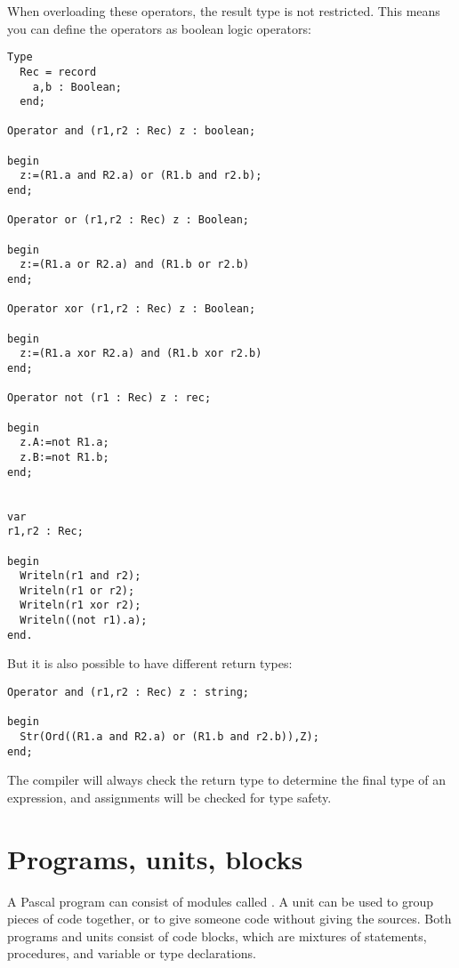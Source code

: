 When overloading these operators, the result type is not restricted. This means you can define the operators as boolean logic operators:
\begin{verbatim}
Type
  Rec = record
    a,b : Boolean;
  end;

Operator and (r1,r2 : Rec) z : boolean;

begin
  z:=(R1.a and R2.a) or (R1.b and r2.b);
end;

Operator or (r1,r2 : Rec) z : Boolean;

begin
  z:=(R1.a or R2.a) and (R1.b or r2.b)
end;

Operator xor (r1,r2 : Rec) z : Boolean;

begin
  z:=(R1.a xor R2.a) and (R1.b xor r2.b)
end;

Operator not (r1 : Rec) z : rec;

begin
  z.A:=not R1.a;
  z.B:=not R1.b;
end;


var
r1,r2 : Rec;

begin
  Writeln(r1 and r2);
  Writeln(r1 or r2);
  Writeln(r1 xor r2);
  Writeln((not r1).a);
end. 
\end{verbatim}

But it is also possible to have different return types:

\begin{verbatim}
Operator and (r1,r2 : Rec) z : string;

begin
  Str(Ord((R1.a and R2.a) or (R1.b and r2.b)),Z);
end;
\end{verbatim}

The compiler will always check the return type to determine the final type of an expression, 
and assignments will be checked for type safety. 


\chapter{Programs, units, blocks}
A Pascal program can consist of modules called . A unit can be used
to group pieces of code together, or to give someone code without giving
the sources.
Both programs and units consist of code blocks, which are mixtures of
statements, procedures, and variable or type declarations.

